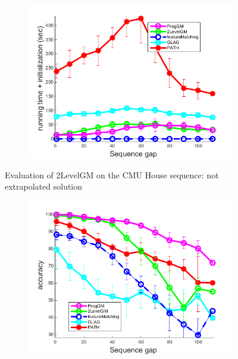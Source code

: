 \documentclass[hyperref={pdfpagelabels=false}]{beamer}
\begin{document}
\begin{frame}
\begin{minipage}[0.2\textheight]{\textwidth}
\begin{columns}[T]
\begin{column}{0.7\textwidth}
\begin{figure}[h]
\begin{subfigure}[b]{0.32\textwidth}
					\end{subfigure}
					\begin{subfigure}[b]{0.32\textwidth}
						\centering
						\includegraphics[scale=0.12]{"fig/evaluation/HouseSeq2/anchor_descr/using_cpd_afftrafo/solution2/performance/time_summary"}
					\end{subfigure} 	
				\caption*{Evaluation of 2LevelGM on the CMU House sequence: not extrapolated solution}
			\end{figure}
			\vspace{-20pt}
			\begin{figure}[h] \centering
					\begin{subfigure}[b]{0.32\textwidth}
						\centering
						\includegraphics[scale=0.12]{"fig/evaluation/HouseSeq2/anchor_descr/using_cpd_afftrafo/ext_solution2/performance/accuracy"} 

\end{subfigure}
\end{figure}
\end{column}
\end{columns}
\end{minipage}
\end{frame}
\end{document}
